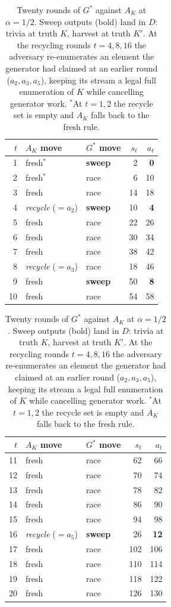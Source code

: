 \documentclass[11pt]{article}
\numberwithin{equation}{section}
\theoremstyle{plain}
\theoremstyle{definition}
\theoremstyle{remark}
\begin{document}
\begin{table}[htbp]
\centering\footnotesize
\begin{tabular}{@{}rllrr@{}}
\toprule
$t$ & $A_K$ move & $G^*$ move & $s_t$ & $a_t$ \\
\midrule
 1 & fresh$^{*}$            & \textbf{sweep} &   2 & \textbf{0} \\
 2 & fresh$^{*}$            & race           &   6 & 10 \\
 3 & fresh                  & race           &  14 & 18 \\
 4 & \emph{recycle} ($=a_2$)& \textbf{sweep} &  10 & \textbf{4} \\
 5 & fresh                  & race           &  22 & 26 \\
 6 & fresh                  & race           &  30 & 34 \\
 7 & fresh                  & race           &  38 & 42 \\
 8 & \emph{recycle} ($=a_3$)& race           &  18 & 46 \\
 9 & fresh                  & \textbf{sweep} &  50 & \textbf{8} \\
10 & fresh                  & race           &  54 & 58 \\
\bottomrule
\end{tabular}
\hspace{1.5em}
\begin{tabular}{@{}rllrr@{}}
\toprule
$t$ & $A_K$ move & $G^*$ move & $s_t$ & $a_t$ \\
\midrule
11 & fresh                  & race           &  62 &  66 \\
12 & fresh                  & race           &  70 &  74 \\
13 & fresh                  & race           &  78 &  82 \\
14 & fresh                  & race           &  86 &  90 \\
15 & fresh                  & race           &  94 &  98 \\
16 & \emph{recycle} ($=a_5$)& \textbf{sweep} &  26 & \textbf{12} \\
17 & fresh                  & race           & 102 & 106 \\
18 & fresh                  & race           & 110 & 114 \\
19 & fresh                  & race           & 118 & 122 \\
20 & fresh                  & race           & 126 & 130 \\
\bottomrule
\end{tabular}
\caption{Twenty rounds of $G^*$ against $A_K$ at $\alpha = 1/2$. Sweep outputs (bold) land
in $D$: trivia at truth $K$, harvest at truth $K'$. At the recycling rounds $t = 4, 8, 16$
the adversary re-enumerates an element the generator had claimed at an earlier round
($a_2, a_3, a_5$), keeping its stream a legal full enumeration of $K$ while cancelling
generator work. ${}^{*}$At $t = 1, 2$ the recycle set is empty and $A_K$ falls back to the
fresh rule.}
\label{tab:miniature}
\end{table}
\end{document}
